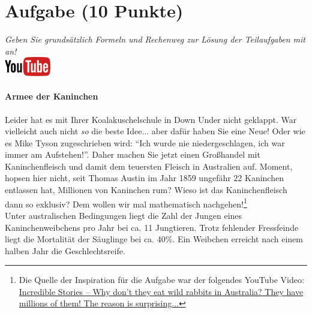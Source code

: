 \documentclass[a4paper, 10pt]{scrartcl}\usepackage[]{graphicx}\usepackage[]{xcolor}
\begin{document}
\clearpage

\section{Aufgabe \hfill (10 Punkte)}

\textit{Geben Sie grunds{\"a}tzlich Formeln und Rechenweg zur L{\"o}sung der
  Teilaufgaben mit an!} \\[1Ex]

\hfill\href{https://youtu.be/iErlRMwQ2RE}{\includegraphics[width =
  2cm]{img/youtube}} %
\hspace{2Ex}

\paragraph{Armee der Kaninchen}



Leider hat es mit Ihrer Koalakuschelschule in Down Under nicht geklappt. War vielleicht
auch nicht \textit{so} die beste Idee... aber daf{\"u}r haben Sie eine Neue!
Oder wie es Mike Tyson zugeschrieben wird: "`Ich wurde nie
niedergeschlagen, ich war immer am Aufstehen!"'. Daher machen Sie jetzt
einen Gro{\ss}handel mit Kaninchenfleisch und damit dem teuersten Fleisch in
Australien auf. Moment, hopsen hier nicht, seit Thomas Austin im Jahr
1859 ungef{\"a}hr 22 Kaninchen entlassen hat,
Millionen von Kaninchen rum? Wieso ist das Kaninchenfleisch dann so
exklusiv? Dem wollen wir mal mathematisch nachgehen!\footnote{Die Quelle
  der Inspiration f{\"u}r die Aufgabe war der folgendes YouTube Video:
  \href{https://youtu.be/38fuOr3tdgc?si=Li7NL_FoByML8JtT}{ Incredible
    Stories -- Why don't they eat wild rabbits in Australia? They have
    millions of them! The reason is surprising...}}
\\

Unter australischen Bedingungen liegt die Zahl der Jungen eines
Kaninchenweibchens pro Jahr bei ca. 11 Jungtieren. Trotz
fehlender Fressfeinde liegt die Mortalit{\"a}t der S{\"a}uglinge bei
ca. 40\%. Ein Weibchen erreicht nach einem halben Jahr die
Geschlechtsreife.
\end{document}
